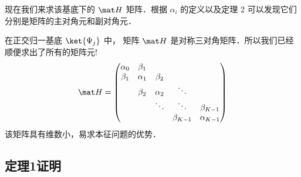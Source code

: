 现在我们来求该基底下的 $\mat H$ 矩阵．根据 $\alpha_i$ 的定义以及定理 2 可以发现它们分别是矩阵的主对角元和副对角元．

{\noindent {}}
在正交归一基底 $\ket{\Psi_j}$ 中， 矩阵 $\mat H$ 是对称三对角矩阵．所以我们已经顺便求出了所有的矩阵元!
\begin{equation}
\mat H =
\begin{pmatrix}
\alpha_0 & \beta_1 &&& \\ 
\beta_1 & \alpha_1 & \beta_2 && \\ 
 & \beta_2 & \alpha_2 & \ddots&  \\ 
& & \ddots& \ddots & {\beta_{K - 1}} \\
&&&\beta_{K - 1} &{\alpha_{K - 1}}
\end{pmatrix}\end{equation}
该矩阵具有维数小，易求本征问题的优势．


\subsection{定理1证明}

